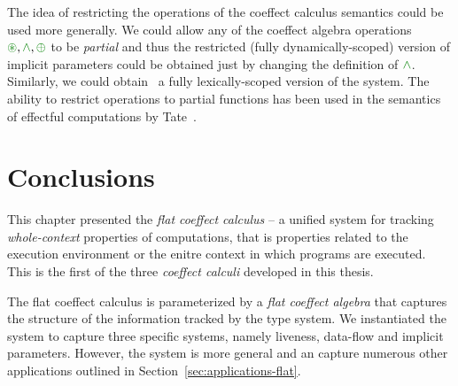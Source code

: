 The idea of restricting the operations of the coeffect calculus semantics could be used more
generally. We could allow any of the coeffect algebra operations $\cseq, \czip, \cpar$ to be
\emph{partial} and thus the restricted (fully dynamically-scoped) version of implicit parameters
could be obtained just by changing the definition of $\czip$. Similarly, we could obtain \eg~a
fully lexically-scoped version of the system. The ability to restrict operations to partial 
functions has been used in the semantics of effectful computations by Tate~\cite{effects-producer-semantics}.

%                                                                             
%                                                                             
\section{Conclusions}

This chapter presented the \emph{flat coeffect calculus} -- a unified system for tracking 
\emph{whole-context} properties of computations, that is properties related to the 
execution environment or the enitre context in which programs are executed.
This is the first of the three \emph{coeffect calculi} developed in this thesis.

The flat coeffect calculus is parameterized by a \emph{flat coeffect algebra} that captures
the structure of the information tracked by the type system. We instantiated the system to 
capture three specific systems, namely liveness, data-flow and implicit parameters. However,
the system is more general and an capture numerous other applications outlined in Section~\ref{sec:applications-flat}.

